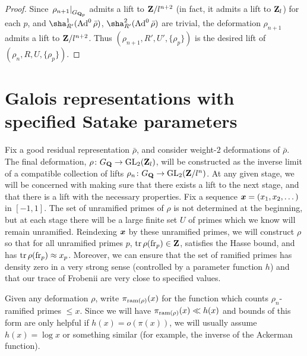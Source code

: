 \begin{proof}
Since $\left.\rho_{n+1}\right|_{G_{\mathbf{Q}_p}}$ admits a lift to $\mathbf{Z}/l^{n+2}$ (in 
fact, it admits a lift to $\mathbf{Z}_l$) for each $p$, and 
$\sha_{R'}^1(\Ad^0\bar\rho)$, $\sha_{R'}^2(\Ad^0\bar\rho)$ are trivial, the 
deformation $\rho_{n+1}$ admits a lift to $\mathbf{Z}/l^{n+2}$. Thus 
$(\rho_{n+1},R',U',\{\rho_p\})$ is the desired lift of 
$(\rho_n,R,U,\{\rho_p\})$. 
\end{proof}





\section{Galois representations with specified Satake parameters}

Fix a good residual representation $\bar\rho$, and consider weight-$2$ 
deformations of $\bar\rho$. The final deformation, 
$\rho\colon G_{\mathbf{Q}} \to \operatorname{GL}_2(\mathbf{Z}_l)$, will be constructed as the inverse limit 
of a compatible collection of lifts $\rho_n\colon G_{\mathbf{Q}} \to \operatorname{GL}_2(\mathbf{Z}/l^n)$. At 
any given stage, we will be concerned with making sure that there exists a 
lift to the next stage, and that there is a lift with the necessary properties. 
Fix a sequence ${\boldsymbol x}=(x_1,x_2,\dots)$ in $[-1,1]$. The set of unramified primes 
of $\rho$ is not determined at the beginning, but at each stage there will be 
a large finite set $U$ of primes which we know will remain unramified. 
Reindexing ${\boldsymbol x}$ by these unramified primes, we will construct $\rho$ so that 
for all unramified primes $p$, $\operatorname{tr}\rho(\mathrm{fr}_p)\in \mathbf{Z}$, satisfies the Hasse 
bound, and has $\operatorname{tr}\rho(\mathrm{fr}_p) \approx x_p$. Moreover, we can ensure that the 
set of ramified primes has density zero in a very strong sense (controlled by a 
parameter function $h$) and that our trace of Frobenii are very close to 
specified values. 

Given any deformation $\rho$, write $\pi_{\mathrm{ram}(\rho)}(x)$ for the function 
which counts $\rho_n$-ramified primes $\leqslant x$. Since we will have 
$\pi_{\mathrm{ram}(\rho)}(x)\ll h(x)$ and bounds of this form are only helpful 
if $h(x) = o(\pi(x))$, we will usually assume $h(x) = \log x$ 
or something similar (for example, the inverse of the Ackerman function). 

